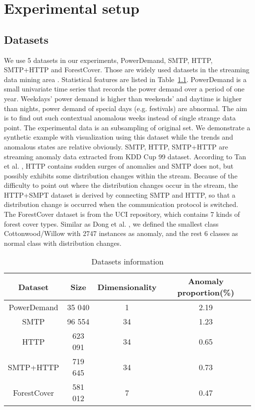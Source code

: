 \chapter{Experimental setup}
\label{chap:Experimentalsetup}


\section{Datasets}
\label{sec:datasets}

We use 5 datasets in our experiments, PowerDemand, SMTP, HTTP, SMTP+HTTP and ForestCover. Those are widely used datasets in the streaming data mining area \cite{encdecad}\cite{threaded}\cite{tan}. Statistical features are listed in  Table~\ref{tab:dataset}. PowerDemand is a small univariate time series that records the power demand over a period of one year. Weekdays’ power demand is higher than weekends’ and daytime is higher than nights, power demand of special days (e.g. festivals) are abnormal. The aim is to find out such contextual anomalous weeks instead of single strange data point. The experimental data is an subsampling of original set. We demonstrate a synthetic example with visualization using this dataset while the trends and anomalous states are relative obviously. SMTP, HTTP, SMTP+HTTP are streaming anomaly data extracted from KDD Cup 99 dataset. According to Tan et al. \cite{tan}, HTTP contains sudden surges of anomalies and SMTP does not, but possibly exhibits some distribution changes within the stream. Because of the difficulty to point out where the distribution changes occur in the stream, the HTTP+SMPT dataset is derived by connecting SMTP and HTTP, so that a distribution change is occurred when the communication protocol is switched. The ForestCover dataset is from the UCI repository, which contains 7 kinds of forest cover types. Similar as Dong et al. \cite{threaded}, we defined the smallest class Cottonwood/Willow with 2747 instances as anomaly, and the rest 6 classes as normal class with distribution changes.

\begin{table}[ht] 
\caption{Datasets information} 
\centering      
\begin{tabular}{c c c c}  
\hline\hline        
Dataset & Size & Dimensionality & Anomaly proportion(\%) \\ [0.5ex] 
\hline 
PowerDemand & 35 040 & 1 &  2.19\\  
SMTP & 96 554 & 34 & 1.23  \\ 
HTTP & 623 091 & 34  & 0.65  \\ 
SMTP+HTTP & 719 645 & 34 & 0.73 \\ 
ForestCover & 581 012 & 7 & 0.47 \\ [1ex]  
\hline    
\end{tabular}
\label{tab:dataset}  
\end{table} 

